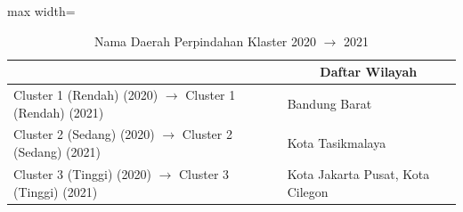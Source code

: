\begin{table}[H]
\centering
\caption{Nama Daerah Perpindahan Klaster 2020 \(\rightarrow\) 2021} \label{tab:sample2transname2020x2021}
\begin{adjustbox}{max width=\textwidth}
\begin{tabular}{|>{\centering\arraybackslash}p{4cm}|p{10cm}|}
\hline
\multicolumn{1}{|c|}{\textbf{Kategori}} & \multicolumn{1}{c|}{\textbf{Daftar Wilayah}} \\
\hline
Cluster 1 (Rendah) (2020) \(\rightarrow\) Cluster 1 (Rendah) (2021) & Bandung Barat \\
\hline
Cluster 2 (Sedang) (2020) \(\rightarrow\) Cluster 2 (Sedang) (2021) & Kota Tasikmalaya \\
\hline
Cluster 3 (Tinggi) (2020) \(\rightarrow\) Cluster 3 (Tinggi) (2021) & Kota Jakarta Pusat, Kota Cilegon \\
\hline
\end{tabular}
\end{adjustbox}
\end{table}